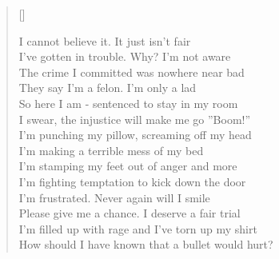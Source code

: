 \documentclass[a5paper,10pt,twoside]{memoir}
\begin{document}
\settowidth{\versewidth}{I'm filled up with rage and I've torn up my shirt} 
\PlainPoemTitle %
{}
\begin{verse}[\versewidth]

I cannot believe it. It just isn't fair\\
I've gotten in trouble. Why? I'm not aware\\
The crime I committed was nowhere near bad\\
They say I'm a felon. I'm only a lad\\
So here I am - sentenced to stay in my room\\
I swear, the injustice will make me go ''Boom!''\\
I'm punching my pillow, screaming off my head\\
I'm making a terrible mess of my bed\\
I'm stamping my feet out of anger and more\\
I'm fighting temptation to kick down the door\\
I'm frustrated. Never again will I smile\\
Please give me a chance. I deserve a fair trial\\
I'm filled up with rage and I've torn up my shirt\\
How should I have known that a bullet would hurt?\\
\end{verse}
\end{document}
